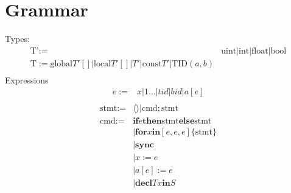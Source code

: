 \documentclass{article}
\newcommand{\nil}{\langle\rangle}
\newcommand{\Global}{\text{global}}
\newcommand{\local}{\text{local}}
\newcommand{\const}{\text{const}}
\newcommand{\tid}[2]{\text{TID}(#1, #2)}
\newcommand{\Ifte}[3]{\textbf{if} #1 \textbf{then} #2 \textbf{else} #3}
\newcommand{\for}[5]{\textbf{for} #1 \textbf{in} [#2, #3, #4] \{#5\}}
\newcommand{\sync}{\textbf{sync}}
\newcommand{\decl}[3]{\textbf{decl} #1 #2 \textbf{in} #3}
\begin{document}
\section{Grammar}
Types:
  \begin{align*}
    \text{T'} := & \text{uint} | \text{int} | \text{float} | \text{bool} \\
    \text{T} := \Global T' [] | \local T' [] | T' | \const T' | \tid{a}{b} \\
  \end{align*}
Expressions
  \begin{align*}
    e := & x | 1\ldots | tid | bid | a[e] \\
  \end{align*}
  \begin{align*}
    \text{stmt} := & \nil | \text{cmd}; \text{stmt}\\
    \text{cmd} := & \Ifte{e}{\text{stmt}}{\text{stmt}} \\
                  & | \for{x}{e}{e}{e}{\text{stmt}} \\
                  & | \sync \\
                  & | x := e \\
                  & | a[e] := e \\
                  & | \decl{T}{x}{S}
  \end{align*}
\end{document}
